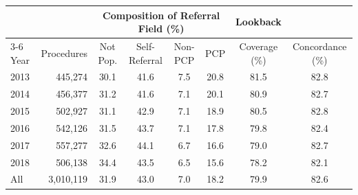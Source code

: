 \begin{tabular}{lrcccccc}
\hline\hline
 & & \multicolumn{4}{c}{Composition of Referral Field (\%)} & Lookback & \\
\cline{3-6}
Year & Procedures & Not Pop. & Self-Referral & Non-PCP & PCP & Coverage (\%) & Concordance (\%) \\
\hline
2013 & 445,274 & 30.1 & 41.6 & 7.5 & 20.8 & 81.5 & 82.8 \\
2014 & 456,377 & 31.2 & 41.6 & 7.1 & 20.1 & 80.9 & 82.7 \\
2015 & 502,927 & 31.1 & 42.9 & 7.1 & 18.9 & 80.5 & 82.8 \\
2016 & 542,126 & 31.5 & 43.7 & 7.1 & 17.8 & 79.8 & 82.4 \\
2017 & 557,277 & 32.6 & 44.1 & 6.7 & 16.6 & 79.0 & 82.7 \\
2018 & 506,138 & 34.4 & 43.5 & 6.5 & 15.6 & 78.2 & 82.1 \\
\hline
All & 3,010,119 & 31.9 & 43.0 & 7.0 & 18.2 & 79.9 & 82.6 \\
\hline\hline
\end{tabular}
